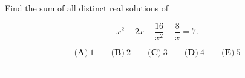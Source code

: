 Find the sum of all distinct real solutions of



\[
x^2-2x+\dfrac{16}{x^2}-\dfrac{8}{x}=7.
\]

\[
\textbf{(A)}\ 1
\qquad
\textbf{(B)}\ 2
\qquad
\textbf{(C)}\ 3
\qquad
\textbf{(D)}\ 4
\qquad
\textbf{(E)}\ 5
\]

---
